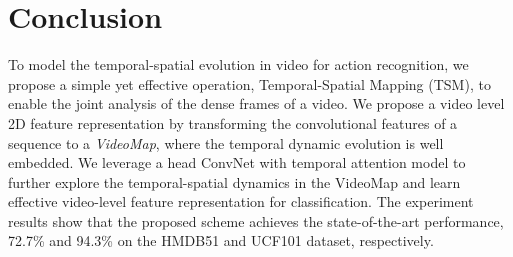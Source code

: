 \documentclass[english, 10pt, twocolumn, twoside]{IEEEtran}
\begin{document}
\section{Conclusion}

To model the temporal-spatial evolution in video for action recognition, we propose a simple yet effective operation, Temporal-Spatial Mapping (TSM), to enable the joint analysis of the dense frames of a video. We propose a video level 2D feature representation by transforming the convolutional features of a sequence to a \emph{VideoMap}, where the temporal dynamic evolution is well embedded. We leverage a head ConvNet with temporal attention model to further explore the temporal-spatial dynamics in the VideoMap and learn effective video-level feature representation for classification. The experiment results show that the proposed scheme achieves the state-of-the-art performance, 72.7\% and 94.3\% on the HMDB51 and UCF101 dataset, respectively.









\ifCLASSOPTIONcaptionsoff
  \newpage
\fi







\end{document}
